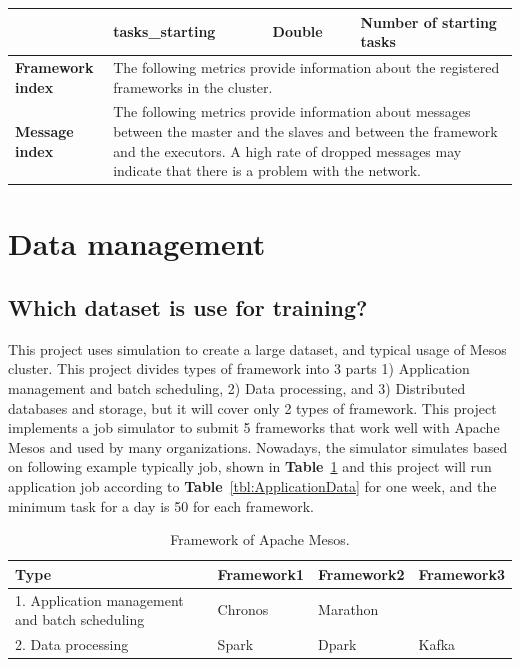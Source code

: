 \documentclass[12pt,oneside,openright,a4paper]{cpe-english-project}
\begin{document}
\begin{table}[!h]
\begin{tabular}{|p{}|p{}|p{}|p{}|}
\cline{2-4} & tasks\_starting & Double & Number of starting tasks \\ 
\hline
\textbf{Framework index} & \multicolumn{3}{p{0.7\textwidth}|}{ The following metrics provide information about the registered frameworks in the cluster.} \\ 
\hline
\textbf{Message index} & \multicolumn{3}{p{0.7\textwidth}|}{ The following metrics provide information about messages between the master and the slaves and between the framework and the executors. A high rate of dropped messages may indicate that there is a problem with the network.} \\ 
\hline
\end{tabular}
\end{table}

\newpage

\section{Data management }

\subsection{Which dataset is use for training?}
This project uses simulation to create a large dataset, and typical usage of Mesos cluster. This project divides types of framework into 3 parts 1) Application management and batch scheduling, 2) Data processing, and 3) Distributed databases and storage, but it will cover only 2 types of framework. This project implements a job simulator to submit 5 frameworks that work well with Apache Mesos and used by many organizations. Nowadays, the simulator simulates based on following example typically job, shown in \textbf{Table}~\ref{tbl:MesosFramework} and this project will run application job according to \textbf{Table}~\ref{tbl:ApplicationData} for one week, and the minimum task for a day is 50 for each framework.

\begin{table}[!h]
\caption{Framework of Apache Mesos.}\label{tbl:MesosFramework}
\begin{tabular}{@{}|p{}|p{}|p{}|p{}|}
\hline
\textbf{Type} & \textbf{Framework1} & \textbf{Framework2} & \textbf{Framework3}\\
\hline
1. Application management and batch scheduling & Chronos & Marathon & \\
\hline
2. Data processing & Spark & Dpark & Kafka\\
\hline
\end{tabular}
\end{table}
\end{document}

